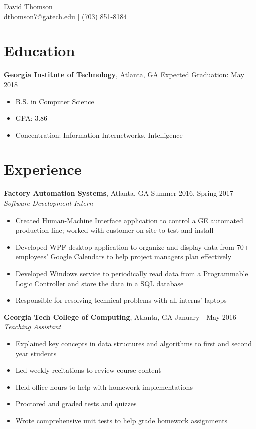 \documentclass[10pt]{article}
\newcommand{\pipe}{| }
\begin{document}
\begin{center}
\vspace*{0.3em}
{\huge David Thomson} \\
\vspace*{1em}
dthomson7@gatech.edu \pipe (703) 851-8184
\end{center}

\section*{Education}
\textbf{Georgia Institute of Technology}, Atlanta, GA \hfill Expected Graduation: May 2018
\begin{itemize}
    \item B.S. in Computer Science
    \item GPA: 3.86
    \item Concentration: Information Internetworks, Intelligence
\end{itemize}

\section*{Experience}
\textbf{Factory Automation Systems}, Atlanta, GA \hfill Summer 2016, Spring 2017
\linebreak
\textit{Software Development Intern}
\begin{itemize}
    \item Created Human-Machine Interface application to control a GE automated production line; worked with customer on site to test and install
    \item Developed WPF desktop application to organize and display data from 70+ employees' Google Calendars to help project managers plan effectively
    \item Developed Windows service to periodically read data from a Programmable Logic Controller and store the data in a SQL database
    \item Responsible for resolving technical problems with all interns' laptops
\end{itemize}

\vspace{3pt}

\textbf{Georgia Tech College of Computing}, Atlanta, GA \hfill January - May 2016
\linebreak
\textit{Teaching Assistant}
\begin{itemize}
    \item Explained key concepts in data structures and algorithms to first and second year students
    \item Led weekly recitations to review course content
    \item Held office hours to help with homework implementations
    \item Proctored and graded tests and quizzes
    \item Wrote comprehensive unit tests to help grade homework assignments
\end{itemize}
\end{document}
